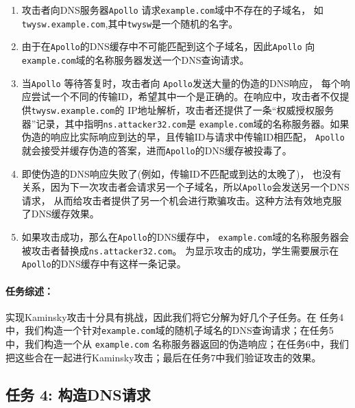 \begin{enumerate}
\item 攻击者向DNS服务器{\tt Apollo} 请求{\tt example.com}域中不存在的子域名，
如{\tt twysw.example.com},其中{\tt twysw}是一个随机的名字。 

\item 由于在{\tt Apollo}的DNS缓存中不可能匹配到这个子域名，因此{\tt Apollo} 
向{\tt example.com}域的名称服务器发送一个DNS查询请求。

\item 当{\tt Apollo} 等待答复时，攻击者向 {\tt Apollo}发送大量的伪造的DNS响应，
每个响应尝试一个不同的传输ID，希望其中一个是正确的。在响应中，攻击者不仅提供{\tt twysw.example.com}的
IP地址解析，攻击者还提供了一条``权威授权服务器''记录，其中指明{\tt ns.attacker32.com}是
{\tt example.com}域的名称服务器。如果伪造的响应比实际响应到达的早，且传输ID与请求中传输ID相匹配，
{\tt Apollo}就会接受并缓存伪造的答案，进而{\tt Apollo}的DNS缓存被投毒了。

\item 即使伪造的DNS响应失败了(例如，传输ID不匹配或到达的太晚了)，
也没有关系，因为下一次攻击者会请求另一个子域名，所以{\tt Apollo}会发送另一个DNS请求，
从而给攻击者提供了另一个机会进行欺骗攻击。这种方法有效地克服了DNS缓存效果。



\item 如果攻击成功，那么在{\tt Apollo}的DNS缓存中，
{\tt example.com}域的名称服务器会被攻击者替换成{\tt ns.attacker32.com}。
为显示攻击的成功，学生需要展示在{\tt Apollo}的DNS缓存中有这样一条记录。
 


\end{enumerate}


\paragraph{任务综述：} 实现Kaminsky攻击十分具有挑战，因此我们将它分解为好几个子任务。在
任务4中，我们构造一个针对\texttt{example.com}域的随机子域名的DNS查询请求；在任务5中，我们构造一个从 \texttt{example.com}
名称服务器返回的伪造响应；在任务6中，我们把这些合在一起进行Kaminsky攻击；最后在任务7中我们验证攻击的效果。


\subsection{任务 4: 构造DNS请求} 


